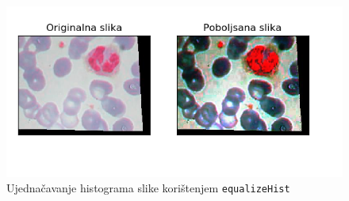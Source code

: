 \documentclass[12pt,a4paper]{article}
\begin{document}
\begin{enumerate}
\begin{figure}[H]
\center
\includegraphics[scale=0.9]{s11Histogram3.png}
\caption{Ujednačavanje histograma slike korištenjem \texttt{equalizeHist}}
	
\end{figure}

\end{enumerate}
\end{document}
